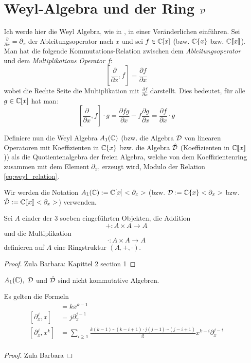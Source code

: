 \section{Weyl-Algebra und der Ring ${\mathcal{D}}$} %
Ich werde hier die Weyl Algebra, wie in
\cite[Chapter~1]{sabbah_cimpa90}, in einer Veränderlichen einführen.
Sei $\frac{\partial}{\partial x}=\partial_x$ der Ableitungsoperator nach $x$
und sei $f \in{\mathbb C}[x]$ (bzw. ${\mathbb C}\{x\}$ bzw. ${\mathbb C}\llbracket x\rrbracket$).
Man hat die folgende Kommutations-Relation zwischen dem
\emph{Ableitungsoperator}
und dem \emph{Multiplikations Operator} $f$:
\begin{equation}\label{eq:weyl_relation}
  [\frac{\partial}{\partial x},f]=\frac{\partial f}{\partial x}
\end{equation}
wobei die Rechte Seite die Multiplikation mit $\frac{\partial f}{\partial x}$
darstellt. Dies bedeutet, für alle $g\in{\mathbb C}[x]$ hat man:
\[
  [\frac{\partial}{\partial x},f]\cdot g
  =\frac{\partial fg}{\partial x} - f\frac{\partial g}{\partial x}
  =\frac{\partial f}{\partial x} \cdot g
\]
\begin{defn}
  Definiere nun die Weyl Algebra $A_1({\mathbb C})$ (bzw. die Algebra ${\mathcal{D}}$ von
  linearen Operatoren mit Koeffizienten in ${\mathbb C}\{x\}$ bzw. die Algebra
  $\hat{{\mathcal{D}}}$ (Koeffizienten in ${\mathbb C}\llbracket x\rrbracket$)) als die
  Quotientenalgebra der freien Algebra, welche von dem Koeffizientenring
  zusammen mit dem Element $\partial_x$, erzeugt wird, Modulo der Relation
  \eqref{eq:weyl_relation}.
\end{defn}
Wir werden die Notation $A_1({\mathbb C}):={\mathbb C}[x]<\partial_x>$ (bzw.
${\mathcal{D}}:={\mathbb C}\{x\}<\partial_x>$ bzw. 
$\hat{{\mathcal{D}}}:={\mathbb C}\llbracket x\rrbracket<\partial_x>$) verwenden.

\begin{lem} %
  Sei $A$ einder der 3 soeben eingeführten Objekten, die Addition 
  \[
    +:A\times A \rightarrow A
  \]
  und die Multiplikation
  \[
    \cdot:A\times A \rightarrow A
  \]
  definieren auf $A$ eine Ringstruktur $(A,+,\cdot)$.
\end{lem}
\begin{proof}
  Zula Barbara: Kapittel 2 section 1
\end{proof}

\begin{rem}
  $A_1({\mathbb C}),~{\mathcal{D}}$ und $\hat{{\mathcal{D}}}$ sind nicht kommutative Algebren.
\end{rem}

\begin{lem}
  Es gelten die Formeln\\
  \begin{align*}
    [\partial_x,x^k] &= kx^{k-1}\\
    [\partial_x^j,x] &= j\partial_x^{j-1}\\
    [\partial_x^j,x^k] &= \sum_{i\geq1}\frac{k(k-1)\cdots(k-i+1)
      \cdot j(j-1)\cdots(j-i+1)}{i!}x^{k-i}\partial_x^{j-i} \\
  \end{align*}
\end{lem}
\begin{proof}
  Zula Barbara
\end{proof}

